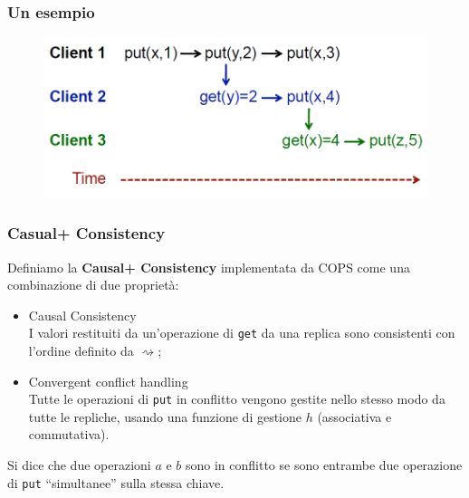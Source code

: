 \begin{frame}
\frametitle{Un esempio}
	\begin{figure}
		\centering
		\includegraphics[scale=0.40]{COPS/COPS2.png}
	\end{figure}
\end{frame}

\begin{frame}
\frametitle{Casual+ Consistency}
\begin{definizione}
Definiamo la \textbf{Causal+ Consistency} implementata da COPS come una combinazione di due proprietà:
	\begin{itemize}
		\item<1-> Causal Consistency \\
				  I valori restituiti da un'operazione di \texttt{get} da una replica sono 
				  consistenti con l'ordine definito da $\rightsquigarrow$;
		\item<1-> Convergent conflict handling \\
				  Tutte le operazioni di \texttt{put} in conflitto vengono gestite nello
				  stesso modo da tutte le repliche, usando una funzione di gestione $h$ (associativa
				  e commutativa).
	\end{itemize}
\end{definizione}

\begin{definizione}
Si dice che due operazioni $a$ e $b$ sono in conflitto se sono entrambe
due operazione di \texttt{put} ``simultanee'' sulla stessa chiave.
\end{definizione}
\end{frame}

